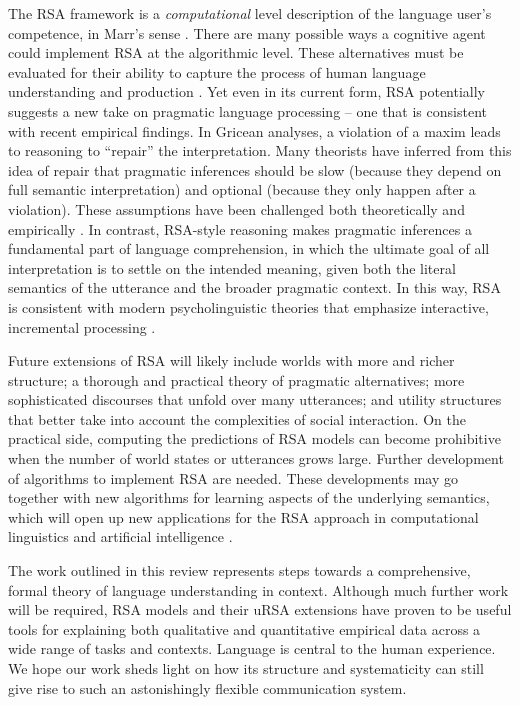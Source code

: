 \documentclass[]{elsarticle}
\begin{document}
The RSA framework is a \emph{computational} level description of the
language user's competence, in Marr's sense \citep{marr1982}. 
There are many
possible ways a cognitive agent could implement RSA at the algorithmic
level. These alternatives must be evaluated for their ability to capture
the process of human language understanding and production \citep{degen2015,nordmeyer2014}. Yet even in its
current form, RSA potentially suggests a new take on pragmatic language
processing -- one that is consistent with recent empirical
findings.
In Gricean analyses, a violation of a maxim leads to reasoning
to ``repair'' the interpretation. Many theorists have inferred from this
idea of repair that pragmatic inferences should be slow (because they
depend on full semantic interpretation) and optional (because they only
happen after a violation). These assumptions have been
challenged both theoretically and empirically \citep[e.g.,][]{levinson2000,grodner2010}. In contrast, RSA-style reasoning makes pragmatic inferences a fundamental part of language comprehension, in which the ultimate goal of all interpretation is to settle on the intended
meaning, given both the literal semantics of the utterance and the
broader pragmatic context. In this way, RSA is consistent with modern
psycholinguistic theories that emphasize interactive, incremental
processing \citep{degen2015}.


Future extensions of RSA will likely include worlds with more and richer structure; 
a thorough and practical theory of pragmatic alternatives; 
more sophisticated discourses that unfold over many utterances; 
and utility structures that better take into account the complexities of social interaction.
On the practical side, computing the predictions of RSA models can
become prohibitive when the number of world states or utterances grows
large. Further development of algorithms to implement RSA are needed.
These
developments may go together with new algorithms for learning aspects of
the underlying semantics, which will open up new applications for the
RSA approach in computational linguistics and artificial intelligence \citep{golland2010,vogel2013b,monroe2015,andreas2016}.

The work outlined in this review represents steps towards a
comprehensive, formal theory of language understanding in context. Although
much further work will be required, RSA models and their uRSA extensions have
proven to be useful tools for explaining both qualitative and
quantitative empirical data across a wide range of tasks and contexts.
Language is central to the human experience. We hope our work sheds
light on how its structure and systematicity can still give rise to such
an astonishingly flexible communication system.
\end{document}
